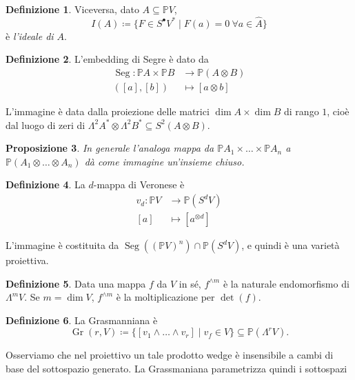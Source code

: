 \documentclass[a4paper, 11pt]{article}
\theoremstyle{definition}
\newtheorem{Def}{Definizione}[section]
\theoremstyle{plain}
\newtheorem{Prop}[Def]{Proposizione}
\newcommand{\PP}{\mathbb{P}}
\newcommand{\deff}{\coloneqq}
\DeclareMathOperator{\Gr}{Gr}
\DeclareMathOperator{\Seg}{Seg}
\begin{document}
\begin{Def}
	Viceversa, dato $A \subseteq \PP V$, 
	\[
		I(A) \deff \{F \in S^\bullet V^\ast \mid F(a) = 0\ \forall a \in \hat{A}\}
	\]
	è \emph{l'ideale di $A$}.
\end{Def}
\begin{Def}
	L'embedding di Segre è dato da
	\[
	\begin{split}
		\Seg \colon \PP A \times \PP B &\to \PP (A \otimes B)\\
		([a], [b]) &\mapsto [a \otimes b]
	\end{split}
	\]
\end{Def}
L'immagine è data dalla proiezione delle matrici $\dim A \times \dim B$ di rango $1$, cioè dal luogo di zeri di $\Lambda^2A^\ast \otimes \Lambda^2B^\ast \subseteq S^2(A \otimes B)$.
\begin{Prop}
	In generale l'analoga mappa da $\PP A_1 \times \dots \times \PP A_n $ a $\PP(A_1 \otimes\dots\otimes A_n)$ dà come immagine un'insieme chiuso.
\end{Prop}
\begin{Def}
	La $d$-mappa di Veronese è
	\[
	\begin{split}
		v_d \colon \PP V &\to \PP(S^dV) \\
		[a] &\mapsto [a^{\otimes d}]
	\end{split}
	\]
\end{Def}

L'immagine è costituita da $\Seg((\PP V)^n) \cap \PP(S^d V)$, e quindi è una varietà proiettiva.

\begin{Def}
	Data una mappa $f$ da $V$ in sé, $f^{\wedge m}$ è la naturale endomorfismo di $\Lambda^m V$. Se $m = \dim V$, $f^{\wedge m}$ è la moltiplicazione per $\det(f)$.
\end{Def}
\begin{Def}
	La Grasmanniana è 
	\[
		\Gr(r,V) \deff \{[v_1 \wedge \dots \wedge v_r] \mid v_f \in V\} \subseteq \PP(\Lambda^r V).
	\]
\end{Def}
Osserviamo che nel proiettivo un tale prodotto wedge è insensibile a cambi di base del sottospazio generato. La Grassmaniana parametrizza quindi i sottospazi 
\end{document}
